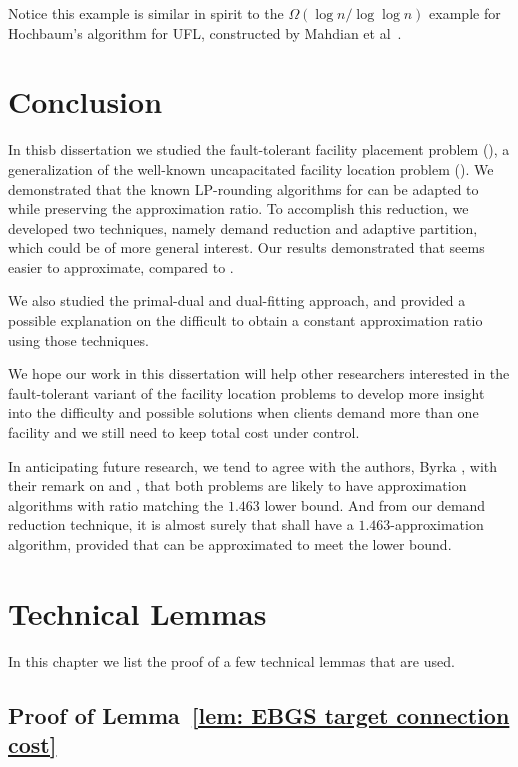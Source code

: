 \documentclass[oneside,final]{ucr}
\begin{document}
Notice this example is similar in spirit to the $\Omega(\log
n/ \log\log n)$ example for Hochbaum's algorithm for UFL,
constructed by Mahdian et al~\cite{JainMMSV03}.

\chapter{Conclusion} \label{ch: conclusion} 

In thisb dissertation we studied the fault-tolerant facility
placement problem ({\FTFP}), a generalization of the
well-known uncapacitated facility location problem
({\UFL}). We demonstrated that the known LP-rounding
algorithms for {\UFL} can be adapted to {\FTFP} while
preserving the approximation ratio. To accomplish this
reduction, we developed two techniques, namely demand
reduction and adaptive partition, which could be of more
general interest. Our results demonstrated that {\FTFP}
seems easier to approximate, compared to {\FTFL}.

We also studied the primal-dual and dual-fitting approach,
and provided a possible explanation on the difficult to
obtain a constant approximation ratio using those techniques.

We hope our work in this dissertation will help other
researchers interested in the fault-tolerant variant of the
facility location problems to develop more insight into the
difficulty and possible solutions when clients demand more
than one facility and we still need to keep total cost under
control.

In anticipating future research, we tend to agree with the
authors, Byrka {\etal}, with their remark on {\UFL} and
{\FTFL}, that both problems are likely to have approximation
algorithms with ratio matching the $1.463$ lower bound. And
from our demand reduction technique, it is almost surely
that {\FTFP} shall have a $1.463$-approximation algorithm,
provided that {\FTFL} can be approximated to meet the lower
bound.




\appendix
\chapter{Technical Lemmas}
In this chapter we list the proof of a few technical lemmas
that are used.

\section{Proof of Lemma~\ref{lem: EBGS target connection
    cost}}
\label{sec: proof of lemma 15}
\end{document}
